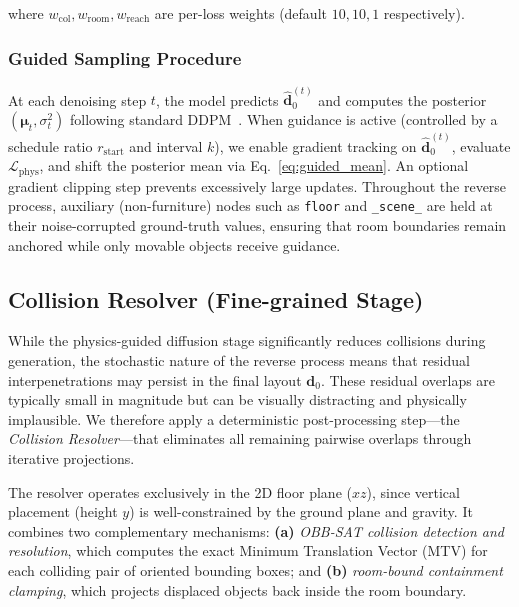 \noindent where $w_{\mathrm{col}}, w_{\mathrm{room}}, w_{\mathrm{reach}}$ are per-loss weights (default $10, 10, 1$ respectively).

\subsubsection{Guided Sampling Procedure}
\label{sec:method:guided_sampling}

At each denoising step $t$, the model predicts $\hat{\mathbf{d}}_0^{(t)}$ and computes the posterior $(\boldsymbol{\mu}_t, \sigma_t^2)$ following standard DDPM~\cite{ho2020ddpm}.
When guidance is active (controlled by a schedule ratio $r_{\mathrm{start}}$ and interval $k$), we enable gradient tracking on $\hat{\mathbf{d}}_0^{(t)}$, evaluate $\mathcal{L}_{\mathrm{phys}}$, and shift the posterior mean via Eq.~\eqref{eq:guided_mean}.
An optional gradient clipping step prevents excessively large updates.
Throughout the reverse process, auxiliary (non-furniture) nodes such as \texttt{floor} and \texttt{\_scene\_} are held at their noise-corrupted ground-truth values, ensuring that room boundaries remain anchored while only movable objects receive guidance.

\subsection{Collision Resolver (Fine-grained Stage)}
\label{sec:method:resolver}

While the physics-guided diffusion stage significantly reduces collisions during generation, the stochastic nature of the reverse process means that residual interpenetrations may persist in the final layout $\mathbf{d}_0$.
These residual overlaps are typically small in magnitude but can be visually distracting and physically implausible.
We therefore apply a deterministic post-processing step---the \emph{Collision Resolver}---that eliminates all remaining pairwise overlaps through iterative projections.

The resolver operates exclusively in the 2D floor plane ($xz$), since vertical placement (height $y$) is well-constrained by the ground plane and gravity.
It combines two complementary mechanisms:
\textbf{(a)} \emph{OBB-SAT collision detection and resolution}, which computes the exact Minimum Translation Vector (MTV) for each colliding pair of oriented bounding boxes; and
\textbf{(b)} \emph{room-bound containment clamping}, which projects displaced objects back inside the room boundary.

